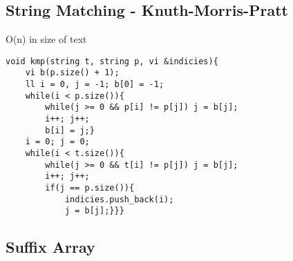 \documentclass[10pt]{article}{\twocolumn}
\begin{document}
\subsection{String Matching - Knuth-Morris-Pratt}
O(n) in size of text
\begin{lstlisting}
void kmp(string t, string p, vi &indicies){
    vi b(p.size() + 1);
    ll i = 0, j = -1; b[0] = -1;
    while(i < p.size()){
        while(j >= 0 && p[i] != p[j]) j = b[j];
        i++; j++;
        b[i] = j;}
    i = 0; j = 0;
    while(i < t.size()){
        while(j >= 0 && t[i] != p[j]) j = b[j];
        i++; j++;
        if(j == p.size()){
            indicies.push_back(i);
            j = b[j];}}}
\end{lstlisting}
\subsection{Suffix Array}
\end{document}

